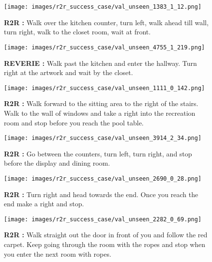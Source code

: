 \RequirePackage[dvipsnames,table]{xcolor} \documentclass[10pt,twocolumn,letterpaper]{article}
\newcommand{\airbert}{Airbert}
\newcommand{\success}{{\color{ForestGreen}{\ding{52}}}}
\begin{document}
\begin{figure*}[t]
    \centering
    \begin{subfigure}[b]{0.47\textwidth}
        \centering
        \texttt{[image: images/r2r\_success\_case/val\_unseen\_1383\_1\_12.png]} 
        \caption{\textbf{R2R \success{}:} Walk over the kitchen counter, turn left,  walk ahead till wall, turn right, walk to the closet room, wait at front.}\label{fig:r2r-closet}\end{subfigure}
    \hfill
    \begin{subfigure}[b]{0.47\textwidth}
         \centering
          \texttt{[image: images/r2r\_success\_case/val\_unseen\_4755\_1\_219.png]} 
          \caption{\textbf{REVERIE \success{}:} Walk past the kitchen and enter the hallway. Turn right at the artwork and wait by the closet.}\label{fig:reverie-closet}\end{subfigure}
    \hfill

    \begin{subfigure}[b]{0.47\textwidth}
        \centering
           \texttt{[image: images/r2r\_success\_case/val\_unseen\_1111\_0\_142.png]}
          \hspace*{-3cm}\caption{\textbf{R2R \success{}:} Walk forward to the sitting area to the right of the stairs. Walk to the wall of windows and take a right into the recreation room and stop before you reach the pool table.}\label{fig:r2r-pool}\end{subfigure}
    \hfill
    \begin{subfigure}[b]{0.47\textwidth}
        \centering
    \hspace*{-2cm}\texttt{[image: images/r2r\_success\_case/val\_unseen\_3914\_2\_34.png]} 
    \caption{\textbf{R2R \success{}:} Go between the counters, turn left, turn right, and stop before the display and dining room.}\label{fig:r2r-image}\end{subfigure}
    \hfill
    \begin{subfigure}[b]{0.47\textwidth}
        \centering
           \texttt{[image: images/r2r\_success\_case/val\_unseen\_2690\_0\_28.png]}\hspace*{-3cm}
    \caption{\textbf{R2R \success{}:} Turn right and head towards the end. Once you reach the end make a right and stop.}\label{fig:r2r-church}\end{subfigure}
   \hfill
    \begin{subfigure}[b]{0.47\textwidth}
      \centering
    \texttt{[image: images/r2r\_success\_case/val\_unseen\_2282\_0\_69.png]} 
    \caption{\textbf{R2R \success{}:} Walk straight out the door in front of you and follow the red carpet. Keep going through the room with the ropes and stop when you enter the next room with ropes.}\label{fig:r2r-redcastle4}\end{subfigure}
    
    \caption{When navigating in new houses, our \airbert~model not only successfully recognizes the closet room in (a) and (b), pool table (c), living room (d), but also generalizes better to challenging environments, such as the church (e) and castle (f).}
    \label{fig:r2r_new_houses}
\end{figure*}
\end{document}
